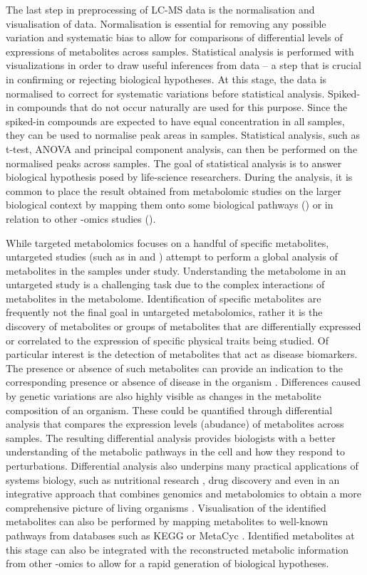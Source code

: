 The last step in preprocessing of LC-MS data is the normalisation and visualisation of data. Normalisation is essential for removing any possible variation and systematic bias to allow for comparisons of differential levels of expressions of metabolites across samples. Statistical analysis is performed with visualizations in order to draw useful inferences from data -- a step that is crucial in confirming or rejecting biological hypotheses. At this stage, the data is normalised to correct for systematic variations before statistical analysis. Spiked-in compounds that do not occur naturally are used for this purpose. Since the spiked-in compounds are expected to have equal concentration in all samples, they can be used to normalise peak areas in samples. Statistical analysis, such as t-test, ANOVA and principal component analysis, can then be performed on the normalised peaks across samples. The goal of statistical analysis is to answer biological hypothesis posed by life-science researchers. During the analysis, it is common to place the result obtained from metabolomic studies on the larger biological context by mapping them onto some biological pathways (\cite{Xia2010,Krumsiek2011a}) or in relation to other -omics studies (\cite{Krumsiek2012,Gieger2008}).

While targeted metabolomics focuses on a handful of specific metabolites, untargeted studies (such as in \cite{DeVos2007a} and \cite{Creek2011}) attempt to perform a global analysis of metabolites in the samples under study. Understanding the metabolome in an untargeted study is a challenging task due to the complex interactions of metabolites in the metabolome. Identification of specific metabolites are frequently not the final goal in untargeted metabolomics, rather it is the discovery of metabolites or groups of metabolites that are differentially expressed or correlated to the expression of specific physical traits being studied. Of particular interest is the detection of metabolites that act as disease biomarkers. The presence or absence of such metabolites can provide an indication to the corresponding presence or absence of disease in the organism \cite{mamas2011role}. Differences caused by genetic variations are also highly visible as changes in the metabolite composition of an organism. These could be quantified through differential analysis that compares the expression levels (abudance) of metabolites across samples. The resulting differential analysis provides biologists with a better understanding of the metabolic pathways in the cell and how they respond to perturbations. Differential analysis also underpins many practical applications of systems biology, such as nutritional research \cite{Gibney2005}, drug discovery \cite{Kell2006} and even in an integrative approach that combines genomics and metabolomics to obtain a more comprehensive picture of living organisms \cite{Gieger2008}. Visualisation of the identified metabolites can also be performed by mapping metabolites to well-known pathways from databases such as KEGG \cite{Kanehisa2010} or MetaCyc \cite{caspi2008metacyc}. Identified metabolites at this stage can also be integrated with the reconstructed metabolic information from other -omics \cite{cottret2010metexplore} to allow for a rapid generation of biological hypotheses.

